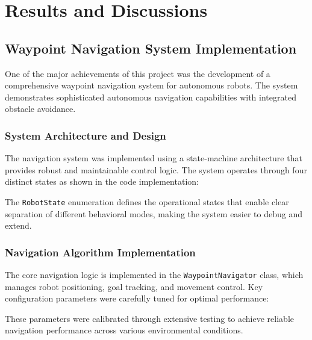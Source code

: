 \documentclass{book}
\begin{document}
\chapter{Results and Discussions}

\section{Waypoint Navigation System Implementation}

\par\noindent One of the major achievements of this project was the development of a comprehensive waypoint navigation system for autonomous robots. The system demonstrates sophisticated autonomous navigation capabilities with integrated obstacle avoidance.

\subsection{System Architecture and Design}

\par\noindent The navigation system was implemented using a state-machine architecture that provides robust and maintainable control logic. The system operates through four distinct states as shown in the code implementation:



\par\noindent The \texttt{RobotState} enumeration defines the operational states that enable clear separation of different behavioral modes, making the system easier to debug and extend.

\subsection{Navigation Algorithm Implementation}

\par\noindent The core navigation logic is implemented in the \texttt{WaypointNavigator} class, which manages robot positioning, goal tracking, and movement control. Key configuration parameters were carefully tuned for optimal performance:



\par\noindent These parameters were calibrated through extensive testing to achieve reliable navigation performance across various environmental conditions.
\end{document}
